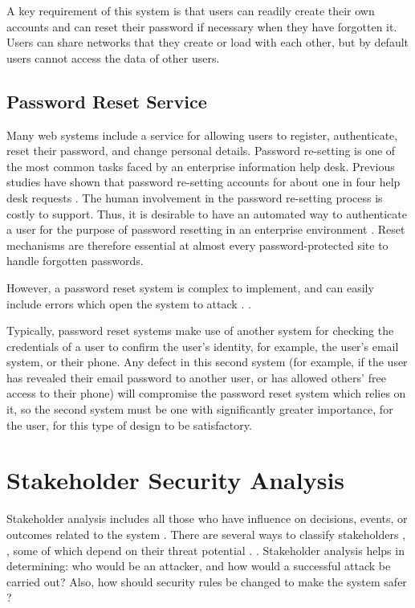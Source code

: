 A key requirement of this system is that users can readily create their own
accounts and can reset their password if necessary when they have forgotten it.
Users can share networks that they create or load with each other, but by default
users cannot access the data of other users.

\subsection{Password Reset Service}
Many web systems include a service for allowing users to register,
authenticate, reset their password, and change personal details.
Password re-setting is one of the most common tasks faced by an
enterprise information help desk. Previous studies have shown that password
re-setting accounts for about one in four help desk requests \cite{bailey2014statistics}. The
human involvement in the password re-setting process is costly to
support. Thus, it is desirable to have an automated way to
authenticate a user for the purpose of password resetting in an
enterprise environment \cite{nimmy2014novel}. Reset mechanisms are therefore
essential at almost every password-protected site to handle forgotten
passwords. 

However, a password reset system is
complex to implement, and can easily include errors which open the system to attack
\iflonger
\cite{routh2018attacks,florencio2014administrator}. 
\else
\cite{routh2018attacks}. 
\fi

Typically, password reset systems make use of another system for checking
the credentials of a user to confirm the user's identity, for example,
the user's email system, or their phone. Any defect
in this second system (for example, if the user has revealed their email password
to another user, or has allowed others' free access to their phone) will compromise the password reset system
which relies on it, so the second system must be one with significantly
greater importance, for the user, for this type of design to be
satisfactory.\\


\section{Stakeholder Security Analysis}\label{stakeholders}

Stakeholder analysis includes all those who have
influence on decisions, events, or outcomes related to
the system \cite{project2018guide,rose2013guide}. There
are several ways to classify stakeholders
\iflonger\cite{reed2009s,maguire2012role,savage1991strategies,maynard2011stakeholders,bourne2016stakeholder,grimble1997stakeholder,billgren2008approaching},
\else
\cite{maguire2012role,maynard2011stakeholders,bourne2016stakeholder},
\fi
some of which depend on their threat potential
\iflonger
\cite{almorsy2016analysis,savage1991strategies,scholl2005interoperability}.
\else
\cite{almorsy2016analysis,savage1991strategies}.
\fi
Stakeholder analysis helps in determining: who would
be an attacker, and how would a successful attack be carried out? Also,
how should security rules be changed to make the system safer \cite{diver2007information}?

